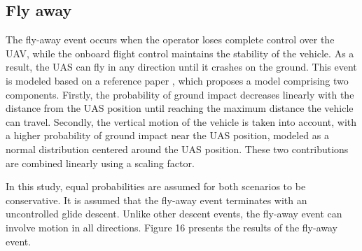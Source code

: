 \documentclass[12pt]{report}
\begin{document}
        \subsection{Fly away}
        The fly-away event occurs when the operator loses complete control over the UAV, while the onboard flight
        control maintains the stability of the vehicle. As a result, the UAS can fly in any direction until it crashes
        on the ground. This event is modeled based on a reference paper \cite{la_cour-harbo_quantifying_2019} , which proposes a model comprising two
        components. Firstly, the probability of ground impact decreases linearly with the distance from the UAS position
        until reaching the maximum distance the vehicle can travel. Secondly, the vertical motion of the vehicle is
        taken into account, with a higher probability of ground impact near the UAS position, modeled as a normal
        distribution centered around the UAS position. These two contributions are combined linearly using a scaling
        factor.
            
        In this study, equal probabilities are assumed for both scenarios to be conservative. It is assumed that the
        fly-away event terminates with an uncontrolled glide descent. Unlike other descent events, the fly-away event
        can involve motion in all directions. Figure 16 presents the results of the fly-away event.
\end{document}
